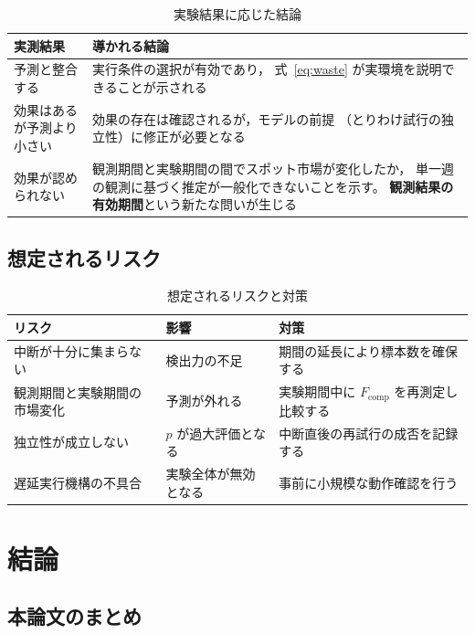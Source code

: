 \documentclass[11pt,a4paper]{ltjsreport}
\newcommand{\Fcomp}{F_{\mathrm{comp}}}
\begin{document}
\begin{table}[htbp]
\centering
\caption{実験結果に応じた結論}
\label{tab:outcomes}
\small
\begin{tabularx}{\textwidth}{@{}lX@{}}
\toprule
実測結果 & 導かれる結論 \\
\midrule
予測と整合する
  & 実行条件の選択が有効であり，
    式~\eqref{eq:waste} が実環境を説明できることが示される \\
\addlinespace
効果はあるが予測より小さい
  & 効果の存在は確認されるが，モデルの前提
    （とりわけ試行の独立性）に修正が必要となる \\
\addlinespace
効果が認められない
  & 観測期間と実験期間の間でスポット市場が変化したか，
    単一週の観測に基づく推定が一般化できないことを示す。
    \textbf{観測結果の有効期間}という新たな問いが生じる \\
\bottomrule
\end{tabularx}
\end{table}

\section{想定されるリスク}

\begin{table}[htbp]
\centering
\caption{想定されるリスクと対策}
\label{tab:risks}
\small
\begin{tabularx}{\textwidth}{@{}XXX@{}}
\toprule
リスク & 影響 & 対策 \\
\midrule
中断が十分に集まらない
  & 検出力の不足
  & 期間の延長により標本数を確保する \\
\addlinespace
観測期間と実験期間の市場変化
  & 予測が外れる
  & 実験期間中に $\Fcomp$ を再測定し比較する \\
\addlinespace
独立性が成立しない
  & $p$ が過大評価となる
  & 中断直後の再試行の成否を記録する \\
\addlinespace
遅延実行機構の不具合
  & 実験全体が無効となる
  & 事前に小規模な動作確認を行う \\
\bottomrule
\end{tabularx}
\end{table}

\chapter{結論}
\label{chap:conclusion}

\section{本論文のまとめ}
\end{document}
